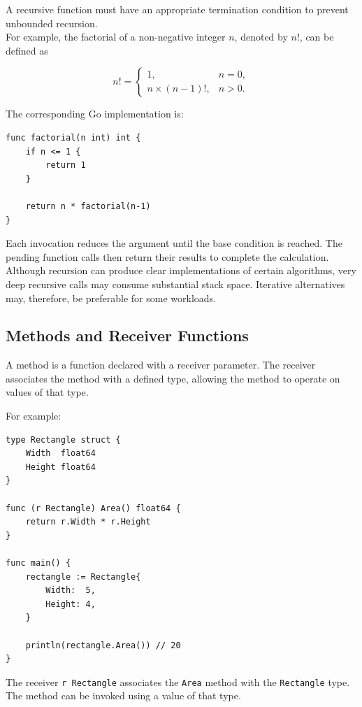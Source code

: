 A recursive function must have an appropriate termination condition to prevent unbounded recursion.\\

For example, the factorial of a non-negative integer \(n\), denoted by \(n!\), can be defined as

\[
n! =
\begin{cases}
1, & n = 0,\\
n \times (n-1)!, & n > 0.
\end{cases}
\]

The corresponding Go implementation is:

\begin{lstlisting}
func factorial(n int) int {
    if n <= 1 {
        return 1
    }

    return n * factorial(n-1)
}
\end{lstlisting}

Each invocation reduces the argument until the base condition is reached. The pending function calls then return their results to complete the calculation.\\

Although recursion can produce clear implementations of certain algorithms, very deep recursive calls may consume substantial stack space. Iterative alternatives may, therefore, be preferable for some workloads.

\subsection{Methods and Receiver Functions}

A method is a function declared with a receiver parameter. The receiver associates the method with a defined type, allowing the method to operate on values of that type.

For example:

\begin{lstlisting}
type Rectangle struct {
    Width  float64
    Height float64
}

func (r Rectangle) Area() float64 {
    return r.Width * r.Height
}

func main() {
    rectangle := Rectangle{
        Width:  5,
        Height: 4,
    }

    println(rectangle.Area()) // 20
}
\end{lstlisting}

The receiver \texttt{r Rectangle} associates the \texttt{Area} method with the \texttt{Rectangle} type. The method can be invoked using a value of that type.\\

